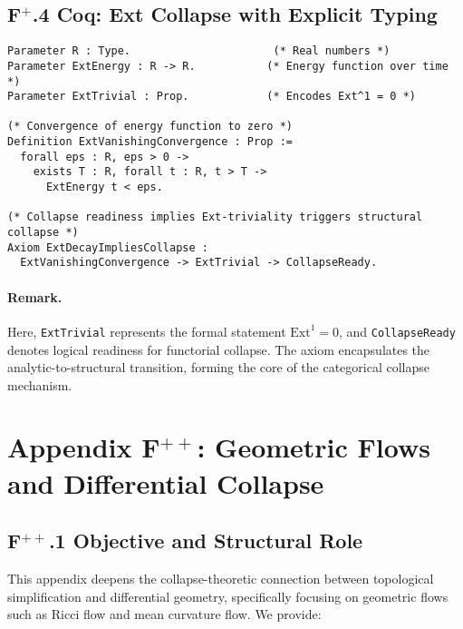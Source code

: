 \documentclass[11pt]{article}
\begin{document}
\subsection*{F$^+$.4 Coq: Ext Collapse with Explicit Typing}

\begin{lstlisting}[language=Coq, caption={Ext Collapse Convergence and Transition}]
Parameter R : Type.                      (* Real numbers *)
Parameter ExtEnergy : R -> R.           (* Energy function over time *)
Parameter ExtTrivial : Prop.            (* Encodes Ext^1 = 0 *)

(* Convergence of energy function to zero *)
Definition ExtVanishingConvergence : Prop :=
  forall eps : R, eps > 0 ->
    exists T : R, forall t : R, t > T ->
      ExtEnergy t < eps.

(* Collapse readiness implies Ext-triviality triggers structural collapse *)
Axiom ExtDecayImpliesCollapse :
  ExtVanishingConvergence -> ExtTrivial -> CollapseReady.
\end{lstlisting}

\paragraph{Remark.}
Here, \texttt{ExtTrivial} represents the formal statement \( \mathrm{Ext}^1 = 0 \), and \texttt{CollapseReady} denotes logical readiness for functorial collapse. The axiom encapsulates the analytic-to-structural transition, forming the core of the categorical collapse mechanism.



\section*{Appendix F$^{++}$: Geometric Flows and Differential Collapse}

\subsection*{F$^{++}$.1 Objective and Structural Role}

This appendix deepens the collapse-theoretic connection between topological simplification and differential geometry, specifically focusing on geometric flows such as Ricci flow and mean curvature flow. We provide:
\end{document}
